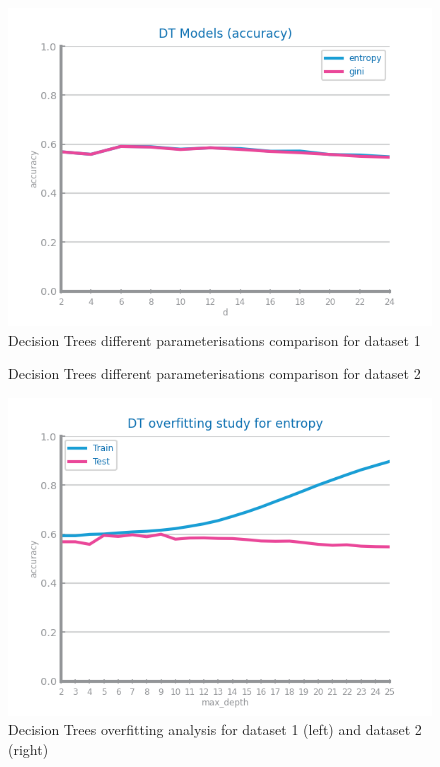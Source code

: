 \documentclass[10pt]{extarticle}
\begin{document}
\begin{figure}[H]
\centering\includegraphics[scale=0.95]{images/dataset1/models_evaluation/CovidPos_dt_accuracy_study.png}
\caption{Decision Trees different parameterisations comparison for dataset 1}
\end{figure}

\begin{figure}[H]
\caption{Decision Trees different parameterisations comparison for dataset 2}
\end{figure}

\begin{figure}[H]
\centering\includegraphics[scale=0.95]{images/dataset1/models_evaluation/CovidPos_dt_accuracy_overfitting.png}
\caption{Decision Trees overfitting analysis for dataset 1 (left) and dataset 2 (right)}
\end{figure}
\end{document}

